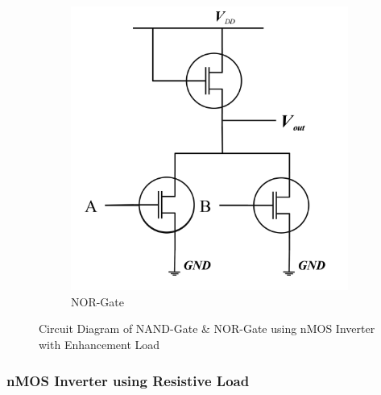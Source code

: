 \documentclass[a4paper,12pt]{article}
\begin{document}
\begin{figure}[H]
\begin{subfigure}[t]{0.49\textwidth}
			\label{fig:ci1}
		\end{subfigure}
		\hfill
		\begin{subfigure}[t]{0.49\textwidth}
			\centering
			\includegraphics[width=1\linewidth]{../EXP04_EEE2214/Images/mos/4}
			\caption{NOR-Gate}
			\label{fig:ci1}
		\end{subfigure}
		\caption{Circuit Diagram of NAND-Gate \& NOR-Gate using nMOS Inverter with Enhancement Load}
	\end{figure}
	
	
	
		\subsubsection{nMOS Inverter using Resistive Load}
		
\end{document}
